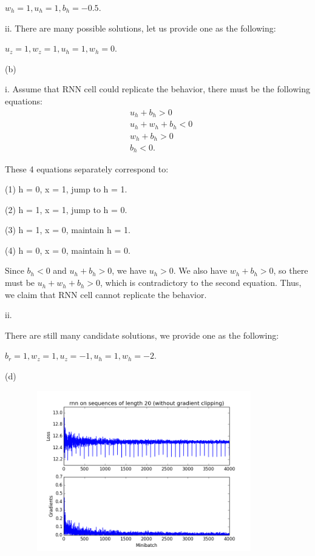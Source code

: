 \documentclass{article}
\theoremstyle{definition}
\theoremstyle{remark}
\numberwithin{equation}{section}
\begin{document}
$w_h = 1, u_h = 1, b_h = -0.5$.

ii. There are many possible solutions, let us provide one as the following:

$u_z = 1, w_z = 1, u_h = 1, w_h = 0$.

\newpage

(b) 

i. Assume that RNN cell could replicate the behavior, there must be the following equations:
\begin{align*}
&u_h  + b_h > 0 \\
&u_h + w_h + b_h < 0 \\
&w_h + b_h > 0 \\
&b_h < 0.
\end{align*}

These 4 equations separately correspond to:

(1) h = 0, x = 1, jump to h = 1. 

(2) h = 1, x = 1, jump to h = 0. 

(3) h = 1, x = 0, maintain h = 1. 
 
(4) h = 0, x = 0, maintain h = 0. 

Since $b_h < 0$ and $u_h  + b_h > 0$, we have $u_h > 0$. We also have $w_h + b_h > 0$, so there must be $u_h + w_h + b_h > 0$, which is contradictory to the second equation. Thus, we claim that RNN cell cannot replicate the behavior.

\vspace{10pt}

ii.

There are still many candidate solutions, we provide one as the following:

$b_r = 1, w_z = 1, u_z = -1, u_h = 1, w_h = -2$.

\newpage
(d)

 \begin{figure}[H] 
  \centering
 \includegraphics[width=100mm, height=70mm]{fig/q3-noclip-rnn.png}
   \caption{}
   \label{fig: noclip_rnn}
 \end{figure}
 
\end{document}
